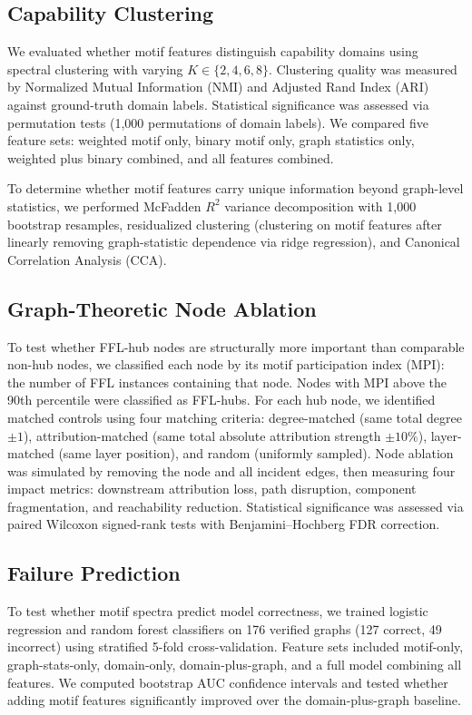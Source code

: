 \documentclass[11pt,letterpaper]{article}
\begin{document}
\subsection{Capability Clustering}

We evaluated whether motif features distinguish capability domains using spectral clustering with varying $K \in \{2, 4, 6, 8\}$. Clustering quality was measured by Normalized Mutual Information (NMI) and Adjusted Rand Index (ARI) against ground-truth domain labels. Statistical significance was assessed via permutation tests (1,000 permutations of domain labels). We compared five feature sets: weighted motif only, binary motif only, graph statistics only, weighted plus binary combined, and all features combined.

To determine whether motif features carry unique information beyond graph-level statistics, we performed McFadden $R^2$ variance decomposition with 1,000 bootstrap resamples, residualized clustering (clustering on motif features after linearly removing graph-statistic dependence via ridge regression), and Canonical Correlation Analysis (CCA).

\subsection{Graph-Theoretic Node Ablation}

To test whether FFL-hub nodes are structurally more important than comparable non-hub nodes, we classified each node by its motif participation index (MPI): the number of FFL instances containing that node. Nodes with MPI above the 90th percentile were classified as FFL-hubs. For each hub node, we identified matched controls using four matching criteria: degree-matched (same total degree $\pm 1$), attribution-matched (same total absolute attribution strength $\pm 10\%$), layer-matched (same layer position), and random (uniformly sampled). Node ablation was simulated by removing the node and all incident edges, then measuring four impact metrics: downstream attribution loss, path disruption, component fragmentation, and reachability reduction. Statistical significance was assessed via paired Wilcoxon signed-rank tests with Benjamini--Hochberg FDR correction.

\subsection{Failure Prediction}

To test whether motif spectra predict model correctness, we trained logistic regression and random forest classifiers on 176 verified graphs (127 correct, 49 incorrect) using stratified 5-fold cross-validation. Feature sets included motif-only, graph-stats-only, domain-only, domain-plus-graph, and a full model combining all features. We computed bootstrap AUC confidence intervals and tested whether adding motif features significantly improved over the domain-plus-graph baseline.
\end{document}
